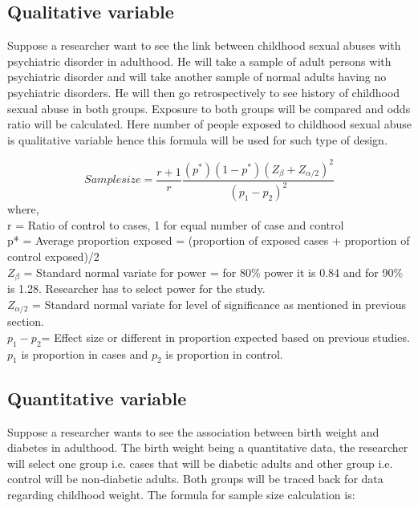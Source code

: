 \documentclass[12pt]{article}
\begin{document}
\subsection{Qualitative variable}
Suppose  a  researcher  want  to  see  the  link  between  
childhood  sexual  abuses  with  psychiatric  disorder  in  
adulthood.  He  will  take  a  sample  of  adult  persons  
with psychiatric disorder and will take another sample 
of normal adults having no psychiatric disorders. He 
will then go retrospectively to see history of childhood 
sexual abuse in both groups. Exposure to both groups 
will be compared and odds ratio will be calculated. Here 
number of people exposed to childhood sexual abuse 
is qualitative variable hence this formula will be used 
for such type of design.

\begin{equation}
Sample size =\dfrac{r+1}{r}\dfrac{(p^*)(1-p^*)(Z_\beta+Z_{\alpha/2})^2}{(p_1-p_2)^2}
\end{equation}
where,\\
r = Ratio  of  control  to  cases,  1  for  equal  number  of  
case and control\\
p*  =  Average  proportion  exposed  =  (proportion  of  
exposed cases + proportion of control exposed)/2\\
$Z_\beta$ =  Standard  normal  variate  for  power  =  for  80\%  
power it is 0.84 and for 90\% is 1.28. Researcher 
has to select power for the study.\\
$Z_{\alpha/2}$ = Standard normal variate for level of significance 
as mentioned in previous section.\\
$p_1-p_2$= Effect size or different in proportion expected 
based on previous studies. $p_1$ is proportion in cases and 
$p_2$ is proportion in control.

\subsection{Quantitative variable}

Suppose  a  researcher  wants  to  see  the  association  
between birth weight and diabetes in adulthood. The 
birth weight being a quantitative data, the researcher will 
select one group i.e. cases that will be diabetic adults and 
other group i.e. control will be non‑diabetic adults. Both 
groups will be traced back for data regarding childhood 
weight. The formula for sample size calculation is:
\end{document}
